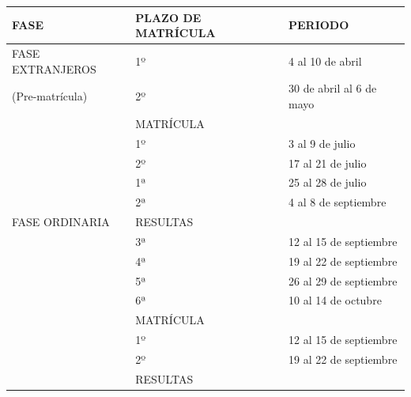 \documentclass{article}
\begin{document}
\begin{itemize}
\begin{itemize}
\begin{scriptsize}
                  \vspace{0.4cm}
                  \begin{table}[h!]\centering\renewcommand{\arraystretch}{1.3}
                    \begin{tabular}{|p{}|p{}|p{}|}\hline
                      FASE                & PLAZO DE MATRÍCULA & PERIODO                  \\\hline
                      FASE EXTRANJEROS    & 1º                 & 4 al 10 de abril         \\\hline
                      (Pre-matrícula)     & 2º                 & 30 de abril al 6 de mayo \\\hline
                                          & MATRÍCULA          &                          \\\hline
                                          & 1º                 & 3 al 9 de julio          \\\hline
                                          & 2º                 & 17 al 21 de julio        \\\hline
                                          & 1ª                 & 25 al 28 de julio        \\\hline
                                          & 2ª                 & 4 al 8 de septiembre     \\\hline
                      FASE ORDINARIA      & RESULTAS           &                          \\\hline
                                          & 3ª                 & 12 al 15 de septiembre   \\\hline
                                          & 4ª                 & 19 al 22 de septiembre   \\\hline
                                          & 5ª                 & 26 al 29 de septiembre   \\\hline
                                          & 6ª                 & 10 al 14 de octubre      \\\hline
                                          & MATRÍCULA          &                          \\\hline
                                          & 1º                 & 12 al 15 de septiembre   \\\hline
                                          & 2º                 & 19 al 22 de septiembre   \\\hline
                                          & RESULTAS           &                          \\\hline

\end{tabular}
\end{table}
\end{scriptsize}
\end{itemize}
\end{itemize}
\end{document}
